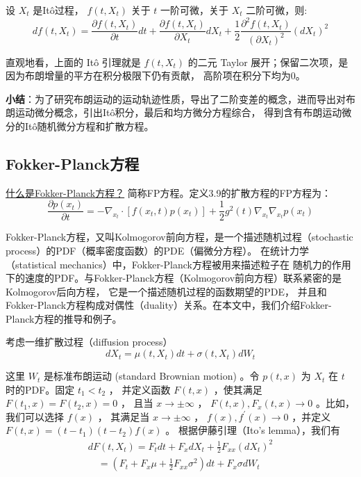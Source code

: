 \begin{lemma}[Itô引理]
  设 $X_t$ 是Itô过程， $f\left(t, X_t\right)$ 关于 $t$ 一阶可微，关于 $X_t$ 二阶可微，则:
\begin{equation}
  d f\left(t, X_t\right)=\frac{\partial f\left(t, X_t\right)}{\partial t} d t+\frac{\partial f\left(t, X_t\right)}{\partial X_t} d X_t+\frac{1}{2} \frac{\partial^2 f\left(t, X_t\right)}{\left(\partial X_t\right)^2}\left(d X_t\right)^2
\end{equation}
\end{lemma}
直观地看，上面的 Itô 引理就是 $f(t,X_t)$ 的二元 Taylor 展开；保留二次项，是因为布朗增量的平方在积分极限下仍有贡献，
高阶项在积分下均为0。

\textbf{小结}：为了研究布朗运动的运动轨迹性质，导出了二阶变差的概念，进而导出对布朗运动微分概念，引出Itô积分，最后和均方微分方程综合，
得到含有布朗运动微分的Itô随机微分方程和扩散方程。




\subsection{Fokker-Planck方程}
\href{https://zhuanlan.zhihu.com/p/535688931}{什么是Fokker-Planck方程？}
简称FP方程。定义3.9的扩散方程的FP方程为：
\begin{equation}
  \frac{\partial p\left(x_t\right)}{\partial t}=-\nabla_{x_t} \cdot\left[f\left(x_t, t\right) p\left(x_t\right)\right]+\frac{1}{2} g^2(t) \nabla_{x_t} \nabla_{x_t} p\left(x_t\right)
\end{equation}

Fokker-Planck方程，又叫Kolmogorov前向方程，是一个描述随机过程（stochastic process）的PDF（概率密度函数）的PDE（偏微分方程）。
在统计力学（statistical mechanics）中，Fokker-Planck方程被用来描述粒子在
随机力的作用下的速度的PDF。与Fokker-Planck方程（Kolmogorov前向方程）联系紧密的是Kolmogorov后向方程，
它是一个描述随机过程的函数期望的PDE，
并且和Fokker-Planck方程构成对偶性（duality）关系。在本文中，我们介绍Fokker-Planck方程的推导和例子。

考虑一维扩散过程（diffusion process）
$$
d X_t=\mu\left(t, X_t\right) d t+\sigma\left(t, X_t\right) d W_t
$$

这里 $W_t$ 是标准布朗运动 (standard Brownian motion) 。令 $p(t, x)$ 为 $X_t$ 在 $t$ 时的PDF。固定 $t_1<t_2$ ，
并定义函数 $F(t, x)$ ，使其满足 $F\left(t_1, x\right)=F\left(t_2, x\right)=0$ ，
且当 $x \rightarrow \pm \infty$ ， $F(t, x), F_x(t, x) \rightarrow 0$ 。比如，我们可以选择 $f(x)$ ，
其满足当 $x \rightarrow \pm \infty$ ，
$f(x), f^{\prime}(x) \rightarrow 0$ ，并定义 $F(t, x)=\left(t-t_1\right)\left(t-t_2\right) f(x)$ 。
根据伊藤引理（Ito's lemma），我们有
$$
\begin{gathered}
d F\left(t, X_t\right)=F_t d t+F_x d X_t+\frac{1}{2} F_{x x}\left(d X_t\right)^2 \\
\quad=\left(F_t+F_x \mu+\frac{1}{2} F_{x x} \sigma^2\right) d t+F_x \sigma d W_t
\end{gathered}
$$

